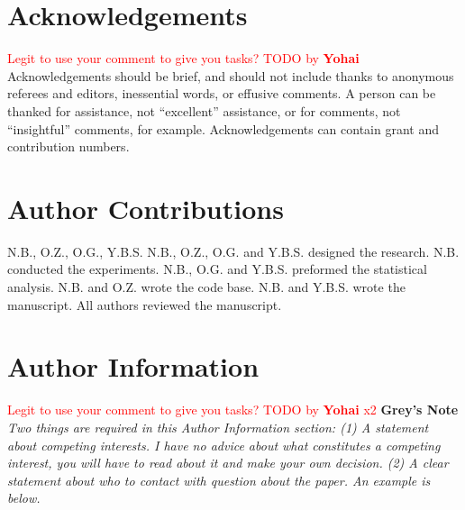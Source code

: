 \documentclass[pdflatex]{sn-jnl}
\newcommand{\yohai}[1]{{\textcolor{red}{#1}}}
\begin{document}
\newpage
\section*{Acknowledgements}
\yohai{Legit to use your comment to give you tasks? TODO by \textbf{Yohai}}
Acknowledgements should be brief, and should not include thanks to anonymous referees and editors, inessential words, or effusive comments. A person can be thanked for assistance, not “excellent” assistance, or for comments, not “insightful” comments, for example. Acknowledgements can contain grant and contribution numbers.

\section*{Author Contributions}
N.B., O.Z., O.G., Y.B.S.
N.B., O.Z., O.G. and Y.B.S. designed the research. N.B. conducted the experiments. N.B., O.G. and Y.B.S. preformed the statistical analysis. N.B. and O.Z. wrote the code base. N.B. and Y.B.S. wrote the manuscript. All authors reviewed the manuscript.

\section*{Author Information}
\yohai{Legit to use your comment to give you tasks? TODO by \textbf{Yohai} x2}
\textbf{Grey's Note} \textit{Two things are required in this Author Information section: (1) A statement about competing interests. I have no advice about what constitutes a competing interest, you will have to read about it and make your own decision. (2) A clear statement about who to contact with question about the paper. An example is below.}


\newpage
\end{document}
